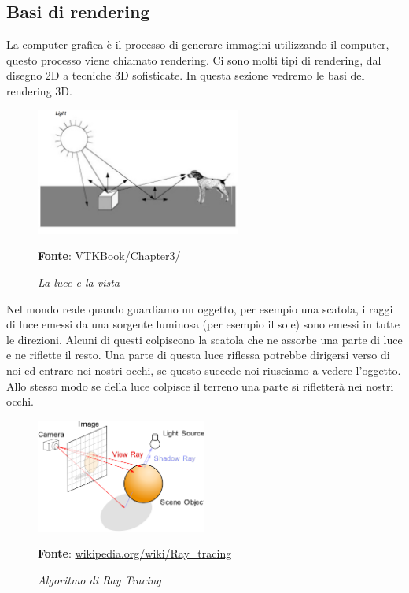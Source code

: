 \subsection{Basi di rendering}\label{sec:basi-rendering}
La computer grafica è il processo di generare immagini utilizzando il computer, questo processo viene chiamato rendering. Ci sono molti tipi di rendering, dal disegno 2D a tecniche 3D sofisticate. In questa sezione vedremo le basi del rendering 3D.

\begin{figure}[h]
    \centering
    \includegraphics[width=0.6\textwidth]{immagini/volumerendering/lightpropagation.png}
    \caption{\textit{La luce e la vista}}
    \textbf{Fonte}: \href{https://lorensen.github.io/VTKExamples/site/VTKBook/03Chapter3/}{VTKBook/Chapter3/}
    \label{fig: Propagazione della luce}
\end{figure}

Nel mondo reale quando guardiamo un oggetto, per esempio una scatola, i raggi di luce emessi da una sorgente luminosa (per esempio il sole) sono emessi in tutte le direzioni. Alcuni di questi colpiscono la scatola che ne assorbe una parte di luce e ne riflette il resto. Una parte di questa luce riflessa potrebbe dirigersi verso di noi ed entrare nei nostri occhi, se questo succede noi riusciamo a vedere l'oggetto. Allo stesso modo se della luce colpisce il terreno una parte si rifletterà nei nostri occhi.

\begin{figure}[h]
    \centering
    \includegraphics[width=0.5\textwidth]{immagini/volumerendering/ray_tracing_diagram.png}
    \caption{\textit{Algoritmo di Ray Tracing}}
    \textbf{Fonte}: \href{https://en.wikipedia.org/wiki/Ray_tracing_(graphics)}{wikipedia.org/wiki/Ray\_tracing}
    \label{fig: Algoritmo di Ray Tracing}
\end{figure}

